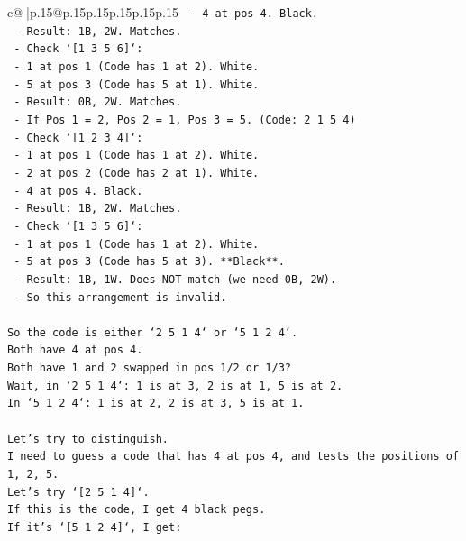 \documentclass{article}
\begin{document}
{\begin{supertabular}{c@{$\;$}|p{.15\linewidth}@{}p{.15\linewidth}p{.15\linewidth}p{.15\linewidth}p{.15\linewidth}p{.15\linewidth}}
{{{\texttt{      {-} 4 at pos 4. Black.} \\
\texttt{      {-} Result: 1B, 2W. Matches.} \\
\texttt{    {-} Check `{[}1 3 5 6{]}`:} \\
\texttt{      {-} 1 at pos 1 (Code has 1 at 2). White.} \\
\texttt{      {-} 5 at pos 3 (Code has 5 at 1). White.} \\
\texttt{      {-} Result: 0B, 2W. Matches.} \\
\texttt{  {-} If Pos 1 = 2, Pos 2 = 1, Pos 3 = 5. (Code: 2 1 5 4)} \\
\texttt{    {-} Check `{[}1 2 3 4{]}`:} \\
\texttt{      {-} 1 at pos 1 (Code has 1 at 2). White.} \\
\texttt{      {-} 2 at pos 2 (Code has 2 at 1). White.} \\
\texttt{      {-} 4 at pos 4. Black.} \\
\texttt{      {-} Result: 1B, 2W. Matches.} \\
\texttt{    {-} Check `{[}1 3 5 6{]}`:} \\
\texttt{      {-} 1 at pos 1 (Code has 1 at 2). White.} \\
\texttt{      {-} 5 at pos 3 (Code has 5 at 3). **Black**.} \\
\texttt{      {-} Result: 1B, 1W. Does NOT match (we need 0B, 2W).} \\
\texttt{      {-} So this arrangement is invalid.} \\
\\ 
\texttt{So the code is either `2 5 1 4` or `5 1 2 4`.} \\
\texttt{Both have 4 at pos 4.} \\
\texttt{Both have 1 and 2 swapped in pos 1/2 or 1/3?} \\
\texttt{Wait, in `2 5 1 4`: 1 is at 3, 2 is at 1, 5 is at 2.} \\
\texttt{In `5 1 2 4`: 1 is at 2, 2 is at 3, 5 is at 1.} \\
\\ 
\texttt{Let's try to distinguish.} \\
\texttt{I need to guess a code that has 4 at pos 4, and tests the positions of 1, 2, 5.} \\
\texttt{Let's try `{[}2 5 1 4{]}`.} \\
\texttt{If this is the code, I get 4 black pegs.} \\
\texttt{If it's `{[}5 1 2 4{]}`, I get:} \\
}}}
\end{supertabular}}
\end{document}
